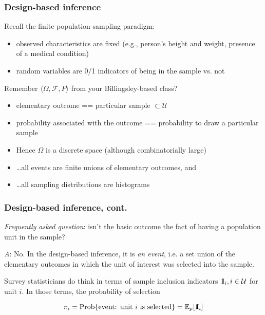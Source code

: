 \documentclass[aspectratio=43]{beamer}
\newcommand{\Expect}{\mathbb{E}}
\newcommand{\One}{{\rm 1\kern-0.3em I}}
\begin{document}
\begin{frame}\frametitle{Design-based inference}

Recall the finite population sampling paradigm:
\begin{itemize}
    \item observed characteristics are fixed (e.g., person's height and weight, presence of a medical condition)
    \item random variables are 0/1 indicators of being in the sample vs. not 
\end{itemize}

Remember $\langle \Omega, \mathcal{F}, P \rangle$ from your Billingsley-based class?
\begin{itemize}
    \item elementary outcome == particular sample $\subset \mathcal U$
    \item probability associated with the outcome == probability to draw a particular sample
    \item Hence $\Omega$ is a discrete space (although combinatorially large)
    \item \ldots all events are finite unions of elementary outcomes, and
    \item \ldots all sampling distributions are histograms
\end{itemize}

\end{frame}

\begin{frame}\frametitle{Design-based inference, cont.}

\textit{Frequently asked question}: isn't the basic outcome 
the fact of having a population unit in the sample?

\textit{A}: No. In the design-based inference, it is \textit{an event},
i.e. a set union of the elementary outcomes in which 
the unit of interest was selected into the sample.

Survey statisticians do think in terms of sample inclusion indicators 
$\One_i, i\in\mathcal{U}$ for unit $i$. In those terms, 
the probability of selection

$$
\pi_i = \mathop{\rm Prob}\{ \mbox{event: unit $i$ is selected}\} = \Expect_p[ \One_i]
$$

\end{frame}
\end{document}
